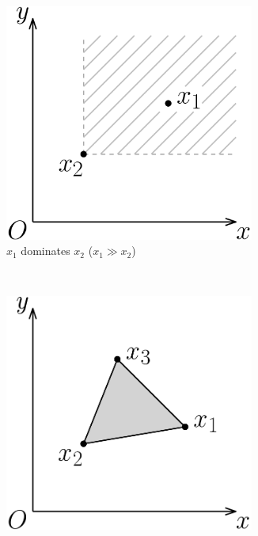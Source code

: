 \documentclass[12pt]{article}
\newcommand{\1}[1]{\mathds{1}[{#1}]}
\begin{document}
    \begin{figure}[t]
      \centering
      \begin{subfigure}[t]{0.3\textwidth}
        \includegraphics[width=0.9\textwidth]{figures/defDom}
        \caption{$x_1$ dominates $x_2$ ($x_1 \gg x_2$)}
        \label{fig:gull}
      \end{subfigure}
      ~
      \begin{subfigure}[t]{0.3\textwidth}
        \includegraphics[width=0.9\textwidth]{figures/defHull}

\end{subfigure}
\end{figure}
\end{document}
